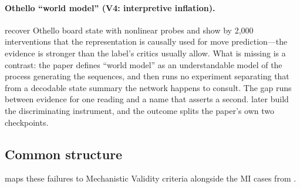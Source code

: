 \documentclass{article}
\begin{document}
\paragraph{Othello ``world model'' (V4: interpretive inflation).}
\citet{li2023othello} recover Othello board state with nonlinear probes and show by 2,000 interventions that the representation is causally used for move prediction---the evidence is stronger than the label's critics usually allow. What is missing is a contrast: the paper defines ``world model'' as an understandable model of the process generating the sequences, and then runs no experiment separating that from a decodable state summary the network happens to consult. The gap runs between evidence for one reading and a name that asserts a second. \citet{vafa2024evaluating} later build the discriminating instrument, and the outcome splits the paper's own two checkpoints.

\subsection{Common structure}

 maps these failures to Mechanistic Validity criteria alongside the MI cases from .
\end{document}
